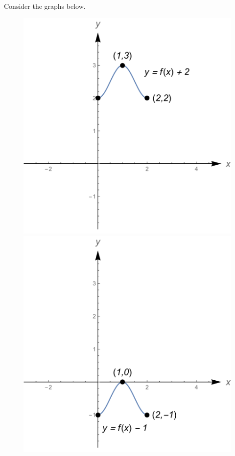 \begin{Answer}\phantom{}
    Consider the graphs below. %
    
    \begin{figure}[H]
        \centering
        \centerline{
        \includegraphics[scale=0.3]{fig_functions_oef_8a}
        \hspace{0.1cm}
        \includegraphics[scale=0.3]{fig_functions_oef_8b}
}
\end{figure}
\end{Answer}
